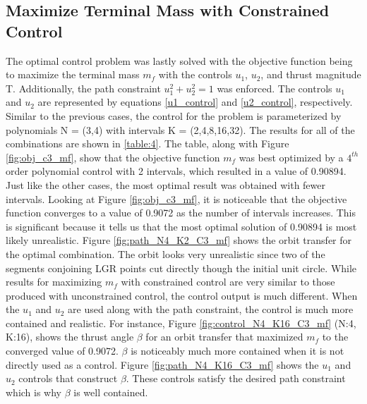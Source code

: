 \documentclass[]{article}
\begin{document}
	\subsection{Maximize Terminal Mass with Constrained Control}
	The optimal control problem was lastly solved with the objective function being to maximize the terminal mass \(m_f\) with the controls \(u_1\), \(u_2\), and thrust magnitude T. Additionally, the path constraint \(u_1^2 + u_2^2 = 1\) was enforced. The controls \(u_1\) and \(u_2\) are represented by equations \ref{u1_control} and \ref{u2_control}, respectively. Similar to the previous cases, the control for the problem is parameterized by polynomials N = (3,4) with intervals K = (2,4,8,16,32). The results for all of the combinations are shown in \ref{table:4}. The table, along with Figure \ref{fig:obj_c3_mf}, show that the objective function \(m_f\) was best optimized by a \(4^{th}\) order polynomial control with 2 intervals, which resulted in a value of 0.90894. Just like the other cases, the most optimal result was obtained with fewer intervals. Looking at Figure \ref{fig:obj_c3_mf}, it is noticeable that the objective function converges to a value of 0.9072 as the number of intervals increases. This is significant because it tells us that the most optimal solution of 0.90894 is most likely unrealistic. Figure \ref{fig:path_N4_K2_C3_mf} shows the orbit transfer for the optimal combination. The orbit looks very unrealistic since two of the segments conjoining LGR points cut directly though the initial unit circle. While results for maximizing \(m_f\) with constrained control are very similar to those produced with unconstrained control, the control output is much different. When the \(u_1\) and \(u_2\) are used along with the path constraint, the control is much more contained and realistic. For instance, Figure \ref{fig:control_N4_K16_C3_mf} (N:4, K:16), shows the thrust angle \(\beta\) for an orbit transfer that maximized \(m_f\) to the converged value of 0.9072. \(\beta\) is noticeably much more contained when it is not directly used as a control. Figure \ref{fig:path_N4_K16_C3_mf} shows the \(u_1\) and \(u_2\) controls that construct \(\beta\). These controls satisfy the desired path constraint which is why \(\beta\) is well contained. 
\end{document}
